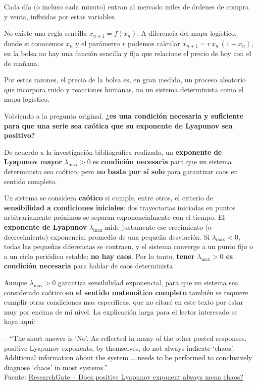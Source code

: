 \documentclass[
  10pt,
  a4paper,
  DIV=11,
  numbers=noendperiod,
  open=any]{scrreprt}
\numberwithin{equation}{chapter}
\numberwithin{equation}{section}
\renewcommand{\[}{\begin{equation}}
\renewcommand{\]}{\end{equation}}
\begin{document}
Cada día (o incluso cada minuto) entran al mercado miles de órdenes de
compra y venta, influidas por estas variables.

No existe una regla sencilla \(x_{n+1} = f(x_n)\). A diferencia del mapa
logístico, donde si conocemos \(x_n\) y el parámetro \(r\) podemos
calcular \(x_{n+1} = r\,x_n\,(1 - x_n)\), en la bolsa no hay una función
sencilla y fija que relacione el precio de hoy con el de mañana.

Por estas razones, el precio de la bolsa es, en gran medida, un proceso
aleatorio que incorpora ruido y reacciones humanas, no un sistema
determinista como el mapa logístico.

Volviendo a la pregunta original. \textbf{¿es una condición necesaria y
suficiente para que una serie sea caótica que su exponente de Lyapunov
sea positivo?}

De acuerdo a la investigación bibliográfica realizada, un
\textbf{exponente de Lyapunov mayor} \(\lambda_{\max} > 0\) es
\textbf{condición necesaria} para que un sistema determinista sea
caótico, pero \textbf{no basta por sí solo} para garantizar caos en
sentido completo.

Un sistema se considera \textbf{caótico} si cumple, entre otros, el
criterio de \textbf{sensibilidad a condiciones iniciales}: dos
trayectorias iniciadas en puntos arbitrariamente próximos se separan
exponencialmente con el tiempo. El \textbf{exponente de Lyapunov}
\(\lambda_{\max}\) mide justamente ese crecimiento (o decrecimiento)
exponencial promedio de una pequeña desviación. Si
\(\lambda_{\max} < 0\), todas las pequeñas diferencias se contraen, y el
sistema converge a un punto fijo o a un ciclo periódico estable:
\textbf{no hay caos}. Por lo tanto, \textbf{tener \(\lambda_{\max} > 0\)
es condición necesaria} para hablar de caos determinista

Aunque \(\lambda_{\max} > 0\) garantiza sensibilidad exponencial, para
que un sistema sea considerado caótico \textbf{en el sentido matemático
completo} también se requiere cumplir otras condiciones mas específicas,
que no citaré en este texto por estar muy por encima de mi nivel. La
explicación larga para el lector interesado se haya aquí:

-- ``The short answer is `No'. As reflected in many of the other posted
responses, positive Lyapunov exponents, by themselves, do not always
indicate `chaos'. Additional information about the system \ldots{} needs
to be performed to conclusively diagnose `chaos' in most systems.''\\
Fuente:
\href{https://www.researchgate.net/post/Does-positive-Lyapunov-exponent-always-mean-chaos}{ResearchGate
-- Does positive Lyapunov exponent always mean chaos?}
\end{document}
